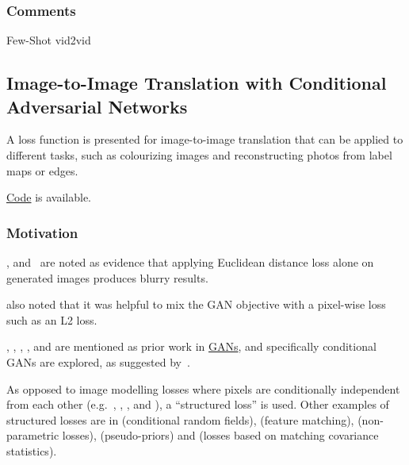 \documentclass[a4paper, 12pt]{article}
\begin{document}
\subsubsection{Comments}

Few-Shot vid2vid


\subsection{Image-to-Image Translation with Conditional Adversarial
            Networks\citet{DBLP:journals/corr/IsolaZZE16}}

A loss function is presented for image-to-image translation that can be applied
to different tasks, such as colourizing images and reconstructing photos from
label maps or edges.

\href{https://github.com/phillipi/pix2pix}{Code} is available.

\subsubsection{Motivation}

\citet{DBLP:journals/corr/LarsenSW15}, \citet{DBLP:journals/corr/PathakKDDE16}
and~\citet{DBLP:journals/corr/ZhangIE16} are noted as evidence that applying
Euclidean distance loss alone on generated images produces blurry results.

\citet{DBLP:journals/corr/PathakKDDE16} also noted that it was helpful to mix
the GAN objective with a pixel-wise loss such as an L2 loss.

\citet{NIPS2014_5423}, \citet{DBLP:journals/corr/DentonCSF15},
\citet{DBLP:journals/corr/RadfordMC15},
\citet{DBLP:journals/corr/SalimansGZCRC16}, and
\citet{DBLP:journals/corr/ZhaoML16} are mentioned as prior work in
\hyperref[gan]{GANs}, and specifically conditional GANs are explored, as
suggested by~\citet{NIPS2014_5423}.

As opposed to image modelling losses where pixels are conditionally independent
from each other (e.g.~\citet{DBLP:journals/corr/ShelhamerLD16},
\citet{DBLP:journals/corr/XieT15}, \citet{IizukaSIGGRAPH2016},
\citet{DBLP:journals/corr/LarssonMS16} and \citet{DBLP:journals/corr/ZhangIE16}),
a ``structured loss'' is used. Other examples of structured losses are in
\citet{DBLP:journals/corr/ChenPKMY14} (conditional random fields),
\citet{DBLP:journals/corr/DosovitskiyB16} (feature matching),
\citet{DBLP:journals/corr/LiW16} (non-parametric losses),
\citet{DBLP:journals/corr/XieHT15} (pseudo-priors) and
\citet{DBLP:journals/corr/JohnsonAL16} (losses based on matching covariance
statistics).
\end{document}
